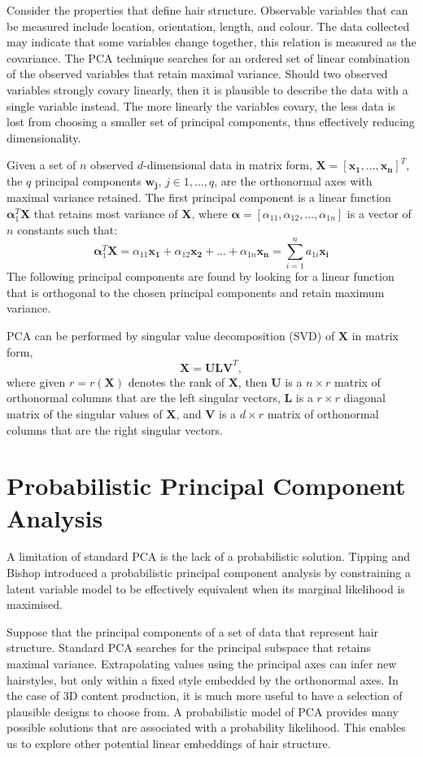 \documentclass[ %
                    author={Dillon Keith Diep [INCOMPLETE DRAFT, NOT FOR SUBMISSION]},
                supervisor={Dr. Carl Henrik Ek},
                    degree={MEng},
                     title={ARt-CG:},
                  subtitle={Assisted Real-time Content Generation of 3D Hair by Learning Manifolds},
                      type={Research},
                      year={2014} ]{dissertation}
\begin{document}
Consider the properties that define hair structure. Observable variables that can be measured include location, orientation, length, and colour. The data collected may indicate that some variables change together, this relation is measured as the covariance. The PCA technique searches for an ordered set of linear combination of the observed variables that retain maximal variance. Should two observed variables strongly covary linearly, then it is plausible to describe the data with a single variable instead. The more linearly the variables covary, the less data is lost from choosing a smaller set of principal components, thus effectively reducing dimensionality.

Given a set of $n$ observed $d$-dimensional data in matrix form, $\mathbf{X=[x_1,...,x_n]}^T$, the $q$ principal components $\mathbf{w_j}$, $j \in {1,...,q}$, are the orthonormal axes with maximal variance retained. The first principal component is a linear function $\boldsymbol{\alpha}^T_1\mathbf{X}$ that retains most variance of $\mathbf{X}$, where $\boldsymbol{\alpha} = [\alpha_{11}, \alpha_{12}, ..., \alpha_{1n}]$ is a vector of $n$ constants such that:
$$\boldsymbol{\alpha}^T_1\mathbf{X}=\alpha_{11}\mathbf{x_1}+\alpha_{12}\mathbf{x_2}+...+\alpha_{1n}\mathbf{x_n} = \sum^n_{i=1}a_{1i}\mathbf{x_i}$$
The following principal components are found by looking for a linear function that is orthogonal to the chosen principal components and retain maximum variance. 

PCA can be performed by singular value decomposition (SVD) of $\mathbf{X}$ in matrix form, \cite{pca2002}
$$\mathbf{X=ULV}^T,$$
where given $r = r(\mathbf{X})$ denotes the rank of $\mathbf{X}$, then
$\mathbf{U}$ is a $n \times r$ matrix of orthonormal columns that are the left singular vectors,
$\mathbf{L}$ is a $r \times r$ diagonal matrix of the singular values of $\mathbf{X}$, and
$\mathbf{V}$ is a $d \times r$ matrix of orthonormal columns that are the right singular vectors.
\section{Probabilistic Principal Component Analysis}
A limitation of standard PCA is the lack of a probabilistic solution. Tipping and Bishop introduced a probabilistic principal component analysis by constraining a latent variable model to be effectively equivalent when its marginal likelihood is maximised. \cite{ppca}

Suppose that the principal components of a set of data that represent hair structure. Standard PCA searches for the principal subspace that retains maximal variance. Extrapolating values using the principal axes can infer new hairstyles, but only within a fixed style embedded by the orthonormal axes. In the case of 3D content production, it is much more useful to have a selection of plausible designs to choose from. A probabilistic model of PCA provides many possible solutions that are associated with a probability likelihood. This enables us to explore other potential linear embeddings of hair structure.
\end{document}
